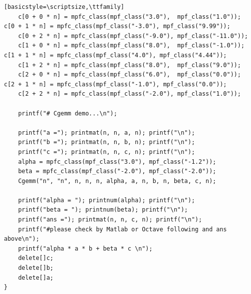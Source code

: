 \documentclass[12pt]{article}
\begin{document}
\begin{lstlisting}[basicstyle=\scriptsize,\ttfamily]
    c[0 + 0 * n] = mpfc_class(mpf_class("3.0"),  mpf_class("1.0"));    c[0 + 1 * n] = mpfc_class(mpf_class("-3.0"), mpf_class("9.99"));
    c[0 + 2 * n] = mpfc_class(mpf_class("-9.0"), mpf_class("-11.0"));
    c[1 + 0 * n] = mpfc_class(mpf_class("8.0"),  mpf_class("-1.0"));   c[1 + 1 * n] = mpfc_class(mpf_class("4.0"), mpf_class("4.44"));
    c[1 + 2 * n] = mpfc_class(mpf_class("8.0"),  mpf_class("9.0"));
    c[2 + 0 * n] = mpfc_class(mpf_class("6.0"),  mpf_class("0.0"));    c[2 + 1 * n] = mpfc_class(mpf_class("-1.0"), mpf_class("0.0"));
    c[2 + 2 * n] = mpfc_class(mpf_class("-2.0"), mpf_class("1.0"));

    printf("# Cgemm demo...\n");

    printf("a ="); printmat(n, n, a, n); printf("\n");
    printf("b ="); printmat(n, n, b, n); printf("\n");
    printf("c ="); printmat(n, n, c, n); printf("\n");
    alpha = mpfc_class(mpf_class("3.0"), mpf_class("-1.2"));
    beta = mpfc_class(mpf_class("-2.0"), mpf_class("-2.0"));
    Cgemm("n", "n", n, n, n, alpha, a, n, b, n, beta, c, n);

    printf("alpha = "); printnum(alpha); printf("\n");
    printf("beta = "); printnum(beta); printf("\n");
    printf("ans ="); printmat(n, n, c, n); printf("\n");
    printf("#please check by Matlab or Octave following and ans above\n");
    printf("alpha * a * b + beta * c \n");
    delete[]c;
    delete[]b;
    delete[]a;
}
\end{lstlisting}
\end{document}
